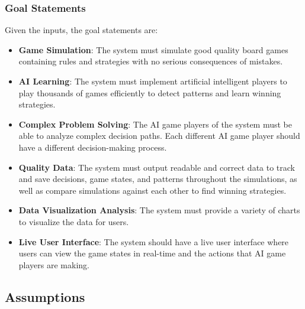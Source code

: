 \documentclass[12pt]{article}
\begin{document}
\subsubsection{Goal Statements}

\noindent Given the inputs, the goal statements are:

\begin{itemize}

\item \textbf{Game Simulation}: The system must simulate good quality board games containing rules and strategies with no serious consequences of mistakes.

\item \textbf{AI Learning}:
The system must implement artificial intelligent players to play thousands of games efficiently to detect patterns and learn winning strategies.   

\item \textbf{Complex Problem Solving}:
The AI game players of the system must be able to analyze complex decision paths. Each different AI game player should have a different decision-making process.  

\item \textbf{Quality Data}:
The system must output readable and correct data to track and save decisions, game states, and patterns throughout the simulations, as well as compare simulations against each other to find winning strategies.

\item \textbf{Data Visualization Analysis}:
The system must provide a variety of charts to visualize the data for users.

\item \textbf{Live User Interface}:
The system should have a live user interface where users can view the game states in real-time and the actions that AI game players are making.


\end{itemize}

\subsection{Assumptions} \label{sec_assumpt}
\end{document}
